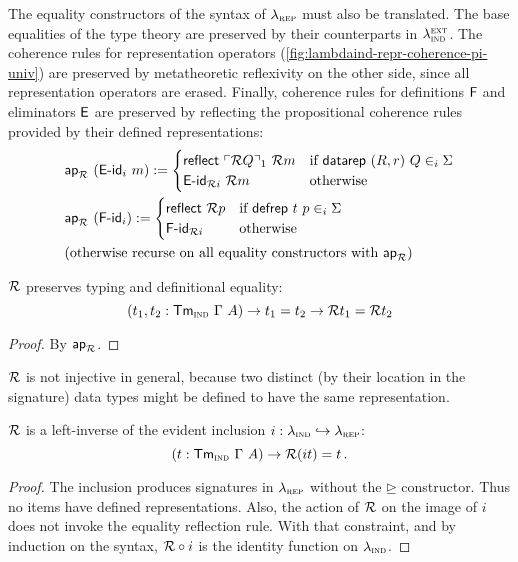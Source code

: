 The equality constructors of the syntax of $\lambda_{\textsc{rep}}$ must also be translated.
The base equalities of the type theory are preserved by their counterparts in $\lambda_{\textsc{ind}}^\textsc{ext}$.
The coherence rules for representation operators
(\cref{fig:lambdaind-repr-coherence-pi-univ}) are preserved by metatheoretic
reflexivity on the other side, since all representation operators are erased.
Finally, coherence rules for definitions $\textsf{F}$ and eliminators $\textsf{E}$ are
preserved by reflecting the propositional coherence rules provided by their
defined representations:
\begin{align*}
& \mta{ap}_\R\ (\mta{E-id}_i\ m) :=
\begin{cases}
    \mta{reflect}\ \emb{\R Q}_1\ \R m & \text{if}\ \mta{datarep}\ (R, r)\ Q \in_i \Sigma \\
    \mta{E-id}_{\R i}\ \R m & \text{otherwise}
    \end{cases} \\
    & \mta{ap}_\R\ (\mta{F-id}_i) :=
    \begin{cases}
        \mta{reflect}\ \R p & \text{if}\ \mta{defrep}\ t\ p \in_i \Sigma \\
        \mta{F-id}_{\R i} & \text{otherwise}
        \end{cases} \\
& \text{(otherwise recurse on all equality constructors with $\mta{ap}_\R$)}
\end{align*}

\begin{theorem}
    $\mathcal{R}$ preserves typing and definitional equality:
    \[
        (t_1, t_2 : \textsf{Tm}_{{\textsc{ind}}}\ \Gamma\ A) \to t_1 = t_2 \to \mathcal{R} t_1 = \mathcal{R} t_2
    \]
    \begin{proof}
        By $\textsf{ap}_{\mathcal{R}}$.
    \end{proof}
\end{theorem}
$\mathcal{R}$ is not injective in general, because two distinct (by their location in the
signature) data types might be defined to have the same representation.

\begin{theorem}
    $\mathcal{R}$ is a left-inverse of the evident inclusion $i : \lambda_{\textsc{ind}} \hookrightarrow \lambda_{\textsc{rep}}$:
    \[
        (t : \textsf{Tm}_{{\textsc{ind}}}\ \Gamma\ A) \to \mathcal{R}(i t) = t \,.
    \]
    \begin{proof}
        The inclusion produces signatures in $\lambda_{\textsc{rep}}$ without the $\unrhd$ constructor. Thus no
        items have defined representations. Also, the action of $\mathcal{R}$ on
        the image of $i$ does not invoke the equality reflection rule. With that
        constraint, and by induction on the syntax, $\mathcal{R} \circ i$ is the identity
        function on $\lambda_{\textsc{ind}}$.
    \end{proof}
\end{theorem}

